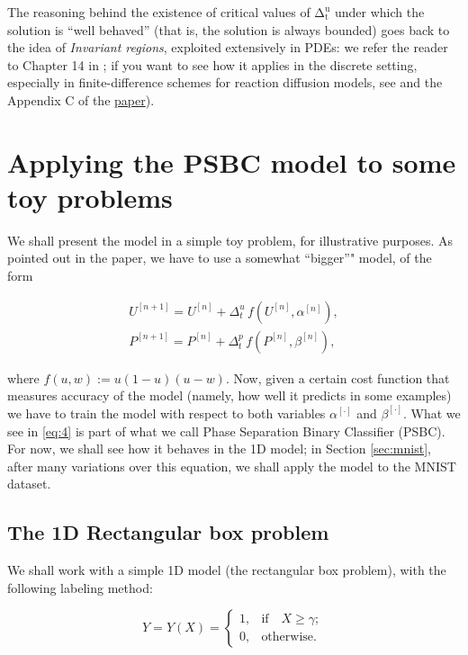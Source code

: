 \documentclass[openany,twoside]{book}
\begin{document}
The reasoning behind the existence of critical values of \(\mathrm{\Delta_{t}^u}\) under which the solution is ``well behaved'' (that is, the solution is always bounded) goes back to the idea of \emph{Invariant regions}, exploited extensively in PDEs: we refer the reader to Chapter 14 in \citep{Smoller}; if you want to see how it applies in the discrete setting, especially in finite-difference schemes for reaction diffusion models, see \citep{Hoff} and the Appendix C of the \href{https://arxiv.org/abs/2009.02467}{paper}).

\hypertarget{sec:1d}{%
\chapter{Applying the PSBC model to some toy problems}\label{sec:1d}}

We shall present the model in a simple toy problem, for illustrative purposes. As pointed out in the paper, we have to use a somewhat ``bigger''" model, of the form

\begin{equation} 
\begin{split}
U^{[n+1]} = U^{[n]} + \Delta_t^{u}\,f(U^{[n]},\alpha^{[n]}),\\
P^{[n+1]} = P^{[n]} + \Delta_t^{p}\,f(P^{[n]},\beta^{[n]}),
\end{split}\label{eq:4}
\end{equation}

where \(f(u,w):= u(1 - u)(u - w)\). Now, given a certain cost function that measures accuracy of the model (namely, how well it predicts in some examples) we have to train the model with respect to both variables \(\alpha^{[\cdot]}\) and \(\beta^{[\cdot]}\). What we see in \eqref{eq:4} is part of what we call Phase Separation Binary Classifier (PSBC). For now, we shall see how it behaves in the 1D model; in Section \ref{sec:mnist}, after many variations over this equation, we shall apply the model to the MNIST dataset.

\hypertarget{the-1d-rectangular-box-problem}{%
\section{The 1D Rectangular box problem}\label{the-1d-rectangular-box-problem}}

We shall work with a simple 1D model (the rectangular box problem), with the following labeling method:

\begin{equation}
Y =Y(X) = \left\{\begin{array}{cc} 1, & \text{if}\quad X \geq \gamma; \\ 
            0, & \text{otherwise}.
\end{array}\right.\label{eq:5}
\end{equation}
\end{document}
